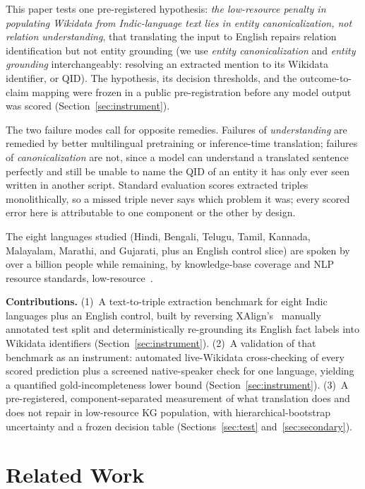 \documentclass{llncs}
\begin{document}
This paper tests one pre-registered hypothesis: \emph{the low-resource penalty
in populating Wikidata from Indic-language text lies in entity
canonicalization, not relation understanding}, that translating the input to
English repairs relation identification but not entity grounding (we use
\emph{entity canonicalization} and \emph{entity grounding} interchangeably:
resolving an extracted mention to its Wikidata identifier, or QID). The
hypothesis, its decision thresholds, and the outcome-to-claim mapping were frozen in a
public pre-registration before any model output was scored
(Section~\ref{sec:instrument}).

The two failure modes call for opposite
remedies. Failures of \emph{understanding} are remedied by
better multilingual pretraining or inference-time translation; failures of
\emph{canonicalization} are not, since a model can understand a translated
sentence perfectly and still be unable to name the QID of an entity it has
only ever seen written in another script. Standard evaluation scores
extracted triples monolithically, so a missed triple never says which
problem it was; every scored error here is attributable to one component or
the other by design.

The eight languages studied (Hindi, Bengali, Telugu, Tamil, Kannada,
Malayalam, Marathi, and Gujarati, plus an English control slice) are spoken
by over a billion people while remaining, by knowledge-base coverage and NLP
resource standards, low-resource~\cite{joshi2020stateandfate}.

\smallskip
\noindent\textbf{Contributions.}
(1)~A text-to-triple extraction benchmark for eight Indic languages plus an
English control, built by reversing XAlign's~\cite{abhishek2022xalign}
manually annotated test split and deterministically re-grounding its
English fact labels into Wikidata identifiers (Section~\ref{sec:instrument}).
(2)~A validation of that benchmark as an instrument: automated live-Wikidata
cross-checking of every scored prediction plus a screened native-speaker
check for one language, yielding a quantified gold-incompleteness lower
bound (Section~\ref{sec:instrument}).
(3)~A pre-registered, component-separated measurement of what translation
does and does not repair in low-resource KG population, with
hierarchical-bootstrap uncertainty and a frozen decision table
(Sections~\ref{sec:test} and~\ref{sec:secondary}).

\section{Related Work}\label{sec:related}
\end{document}

